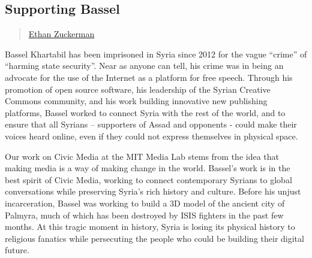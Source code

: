 \subsection{Supporting Bassel}\label{supporting-bassel}

\begin{quote}
\href{../appendix/attributions.html\#ethan-zuckerman}{Ethan Zuckerman}
\end{quote}

Bassel Khartabil has been imprisoned in Syria since 2012 for the vague
``crime'' of ``harming state security''. Near as anyone can tell, his
crime was in being an advocate for the use of the Internet as a platform
for free speech. Through his promotion of open source software, his
leadership of the Syrian Creative Commons community, and his work
building innovative new publishing platforms, Bassel worked to connect
Syria with the rest of the world, and to ensure that all Syrians --
supporters of Assad and opponents - could make their voices heard
online, even if they could not express themselves in physical space.

Our work on Civic Media at the MIT Media Lab stems from the idea that
making media is a way of making change in the world. Bassel's work is in
the best spirit of Civic Media, working to connect contemporary Syrians
to global conversations while preserving Syria's rich history and
culture. Before his unjust incarceration, Bassel was working to build a
3D model of the ancient city of Palmyra, much of which has been
destroyed by ISIS fighters in the past few months. At this tragic moment
in history, Syria is losing its physical history to religious fanatics
while persecuting the people who could be building their digital future.

